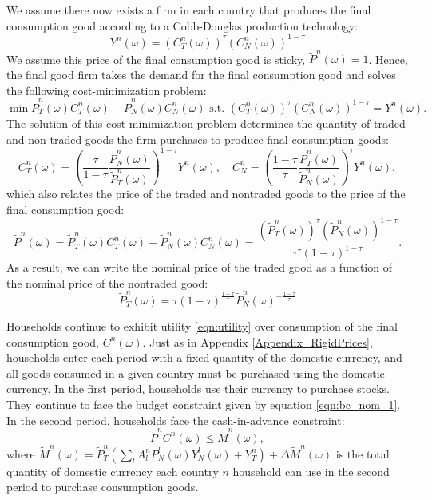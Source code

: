 We assume there now exists a firm in each country that produces the
final consumption good according to a Cobb-Douglas production
technology:
\begin{equation*}
  Y^n(\omega)
  = \left( C^n_T(\omega) \right)^\tau
  \left( C^n_N(\omega) \right)^{1 - \tau}
\end{equation*}
We assume this price of the final consumption good is sticky,
$\tilde{P}^n(\omega) = 1$. Hence, the final good firm takes the demand
for the final consumption good and solves the following
cost-minimization problem:
\begin{equation*}
  \min \tilde P^n_T(\omega) C^n_T(\omega) + \tilde P^n_N(\omega) C^n_N(\omega)
  \text{ s.t. }
  \left( C^n_T(\omega) \right)^{\tau} \left( C^n_N(\omega) \right)^{1 - \tau} =
  Y^n(\omega).
\end{equation*}
The solution of this cost minimization problem determines the quantity
of traded and non-traded goods the firm purchases to produce final
consumption goods:
\begin{equation}
  C^n_T(\omega) = \left( \frac{\tau}{1 - \tau}
    \frac{\tilde{P}^n_N(\omega)}{\tilde{P}^n_T(\omega)}
  \right)^{1- \tau} Y^n(\omega), \quad
  C^n_N = \left( \frac{1 - \tau}{\tau}
    \frac{\tilde{P}^n_T(\omega)}{\tilde{P}^n_N(\omega)}
  \right)^{\tau} Y^n(\omega),
  \label{nomeqn:firm_soln}
\end{equation}
which also relates the price of the traded and nontraded goods to the
price of the final consumption good:
\begin{equation*}
  \tilde{P}^n(\omega)
  = \tilde{P}^n_T(\omega) C^n_T(\omega) + \tilde{P}^n_N(\omega) C^n_N(\omega)
  = \frac{\left(  \tilde{P}^n_T(\omega) \right)^{\tau}
    \left(  \tilde{P}^n_N(\omega) \right)^{1 - \tau}}{\tau^\tau
    (1 - \tau)^{1 - \tau}}.
\end{equation*}
As a result, we can write the nominal price of the traded good as a
function of the nominal price of the nontraded good:
\begin{equation}
  \tilde{P}^n_{T}(\omega)
  = \tau (1 - \tau)^{\frac{1 - \tau}{\tau}}
  \tilde{P}^n_N(\omega)^{ - \frac{1 - \tau}{\tau}}
  \label{cpieqn:PT}
\end{equation}

Households continue to exhibit utility \eqref{eqn:utility} over
consumption of the final consumption good, $C^n(\omega)$. Just as in
Appendix \ref{Appendix_RigidPrices}, households enter each period with
a fixed quantity of the domestic currency, and all goods consumed in a
given country must be purchased using the domestic currency. In the
first period, households use their currency to purchase stocks. They
continue to face the budget constraint given by equation
\eqref{eqn:bc_nom_1}. In the second period, households face the
cash-in-advance constraint:
\begin{equation}
  \tilde{P}^n C^n(\omega) \le \tilde M^n(\omega)
  \label{eqn:bc_nom_cpi_2}, 
\end{equation}
where
$\tilde M^n(\omega) = \tilde{P}^n_T \left( \sum_l A^n_l
  P^l_N(\omega)Y^l_N(\omega) + Y^n_T \right) + \Delta \tilde
M^n(\omega)$ is the total quantity of domestic currency each country
$n$ household can use in the second period to purchase consumption
goods.

